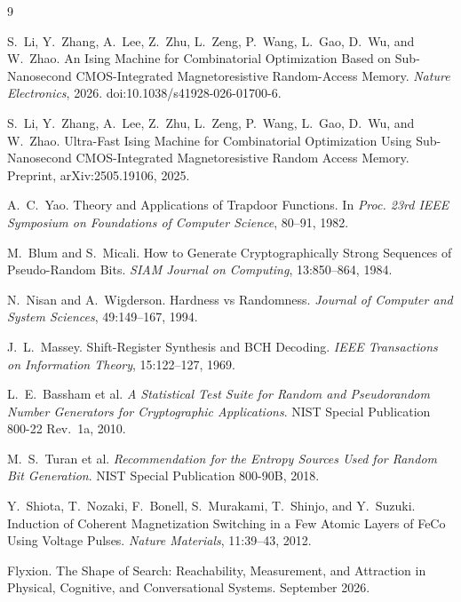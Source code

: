 \documentclass[11pt]{article}
\theoremstyle{definition}
\theoremstyle{remark}
\begin{document}
\begin{thebibliography}{9}

S.~Li, Y.~Zhang, A.~Lee, Z.~Zhu, L.~Zeng, P.~Wang, L.~Gao, D.~Wu, and W.~Zhao.
An Ising Machine for Combinatorial Optimization Based on Sub-Nanosecond CMOS-Integrated Magnetoresistive Random-Access Memory.
\emph{Nature Electronics}, 2026. doi:10.1038/s41928-026-01700-6.

S.~Li, Y.~Zhang, A.~Lee, Z.~Zhu, L.~Zeng, P.~Wang, L.~Gao, D.~Wu, and W.~Zhao.
Ultra-Fast Ising Machine for Combinatorial Optimization Using Sub-Nanosecond CMOS-Integrated Magnetoresistive Random Access Memory.
Preprint, arXiv:2505.19106, 2025.

A.~C.~Yao.
Theory and Applications of Trapdoor Functions.
In \emph{Proc. 23rd IEEE Symposium on Foundations of Computer Science}, 80--91, 1982.

M.~Blum and S.~Micali.
How to Generate Cryptographically Strong Sequences of Pseudo-Random Bits.
\emph{SIAM Journal on Computing}, 13:850--864, 1984.

N.~Nisan and A.~Wigderson.
Hardness vs Randomness.
\emph{Journal of Computer and System Sciences}, 49:149--167, 1994.

J.~L.~Massey.
Shift-Register Synthesis and BCH Decoding.
\emph{IEEE Transactions on Information Theory}, 15:122--127, 1969.

L.~E.~Bassham et al.
\emph{A Statistical Test Suite for Random and Pseudorandom Number Generators for Cryptographic Applications}.
NIST Special Publication 800-22 Rev.~1a, 2010.

M.~S.~Turan et al.
\emph{Recommendation for the Entropy Sources Used for Random Bit Generation}.
NIST Special Publication 800-90B, 2018.

Y.~Shiota, T.~Nozaki, F.~Bonell, S.~Murakami, T.~Shinjo, and Y.~Suzuki.
Induction of Coherent Magnetization Switching in a Few Atomic Layers of FeCo Using Voltage Pulses.
\emph{Nature Materials}, 11:39--43, 2012.

Flyxion.
The Shape of Search: Reachability, Measurement, and Attraction in Physical, Cognitive, and Conversational Systems.
September 2026.

\end{thebibliography}
\end{document}

